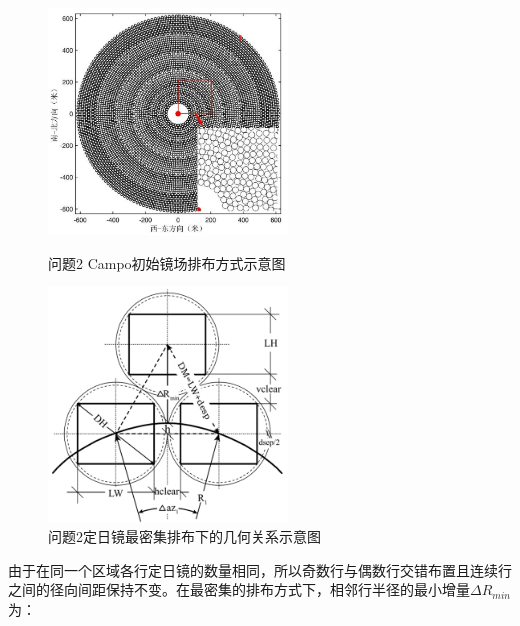 \documentclass{article}
\numberwithin{equation}{subsection}
\begin{document}
\begin{figure}[htbp]
	\begin{minipage}[b]{0.5\linewidth}
		\centering
		\includegraphics[width=2.5in]{问题2-1初始镜场示意图.png}
		\caption{问题2 Campo初始镜场排布方式示意图}
	\end{minipage}
	\begin{minipage}[b]{0.5\linewidth}
		\centering
		\includegraphics[width=2.5in]{问题2-1定日镜最密排列几何关系示意图.png}
		\caption{问题2定日镜最密集排布下的几何关系示意图}
	\end{minipage}
\end{figure}

由于在同一个区域各行定日镜的数量相同，所以奇数行与偶数行交错布置且连续行
之间的径向间距保持不变。在最密集的排布方式下，相邻行半径的最小增量$\Delta R_{min}$为：
\end{document}
